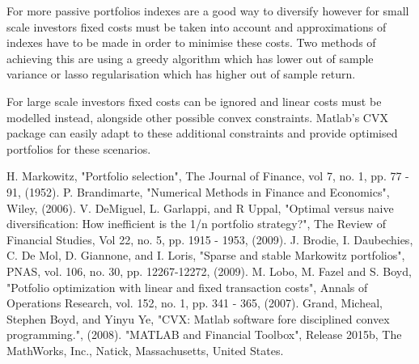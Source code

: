 \documentclass[a4paper,10pt, twocolumn]{article}
\begin{document}
For more passive portfolios indexes are a good way to diversify however for small scale investors fixed costs must be taken into account and approximations of indexes have to be made in order to minimise these costs. Two methods of achieving this are using a greedy algorithm which has lower out of sample variance or lasso regularisation which has higher out of sample return. 

For large scale investors fixed costs can be ignored and linear costs must be modelled instead, alongside other possible convex constraints. Matlab's CVX package can easily adapt to these additional constraints and provide optimised portfolios for these scenarios. 

\begin{thebibliography}{9}
  H. Markowitz,
  "Portfolio selection",
  The Journal of Finance, 
  vol 7, 
  no. 1, 
  pp. 77 - 91, 
  (1952).
  P. Brandimarte,
  "Numerical Methods in Finance and Economics",
  Wiley, 
  (2006).
  V. DeMiguel, L. Garlappi, and R Uppal, 
  "Optimal versus naive diversification: How inefficient is the 1/n portfolio strategy?",
  The Review of Financial Studies, 
  Vol 22,
  no. 5, 
  pp. 1915 - 1953, 
  (2009).
  J. Brodie, I. Daubechies, C. De Mol, D. Giannone, and I. Loris, 
  "Sparse and stable Markowitz portfolios", 
  PNAS, 
  vol. 106, 
  no. 30,
  pp. 12267-12272, 
  (2009).
  M. Lobo, M. Fazel and S. Boyd, 
  "Potfolio optimization with linear and fixed transaction costs", 
  Annals of Operations Research, 
  vol. 152, 
  no. 1, 
  pp. 341 - 365, 
  (2007).
  Grand, Micheal, Stephen Boyd, and Yinyu Ye,
  "CVX: Matlab software fore disciplined convex programming.",
  (2008).
  "MATLAB and Financial Toolbox",
   Release 2015b, 
   The MathWorks, Inc., 
   Natick, 
   Massachusetts, United States.


\end{thebibliography}
\end{document}
